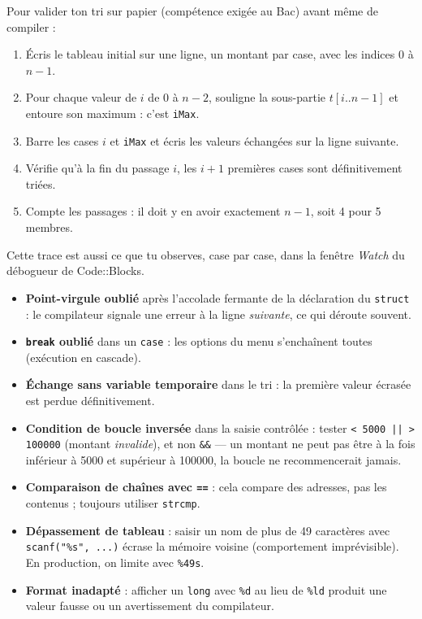 \documentclass[11pt]{article}
\begin{document}
\begin{methode}
Pour valider ton tri sur papier (compétence exigée au Bac) avant même de compiler :
\begin{enumerate}
  \item Écris le tableau initial sur une ligne, un montant par case, avec les indices $0$ à $n-1$.
  \item Pour chaque valeur de $i$ de $0$ à $n-2$, souligne la sous-partie $t[i..n-1]$ et entoure son maximum : c'est \texttt{iMax}.
  \item Barre les cases $i$ et \texttt{iMax} et écris les valeurs échangées sur la ligne suivante.
  \item Vérifie qu'à la fin du passage $i$, les $i+1$ premières cases sont définitivement triées.
  \item Compte les passages : il doit y en avoir exactement $n-1$, soit 4 pour 5 membres.
\end{enumerate}
Cette trace est aussi ce que tu observes, case par case, dans la fenêtre \emph{Watch} du débogueur de Code::Blocks.
\end{methode}

\begin{attention}
\begin{itemize}
  \item \textbf{Point-virgule oublié} après l'accolade fermante de la déclaration du \texttt{struct} : le compilateur signale une erreur à la ligne \emph{suivante}, ce qui déroute souvent.
  \item \textbf{\texttt{break} oublié} dans un \texttt{case} : les options du menu s'enchaînent toutes (exécution en cascade).
  \item \textbf{Échange sans variable temporaire} dans le tri : la première valeur écrasée est perdue définitivement.
  \item \textbf{Condition de boucle inversée} dans la saisie contrôlée : tester \texttt{< 5000 || > 100000} (montant \emph{invalide}), et non \texttt{\&\&} — un montant ne peut pas être à la fois inférieur à \num{5000} et supérieur à \num{100000}, la boucle ne recommencerait jamais.
  \item \textbf{Comparaison de chaînes avec \texttt{==}} : cela compare des adresses, pas les contenus ; toujours utiliser \texttt{strcmp}.
  \item \textbf{Dépassement de tableau} : saisir un nom de plus de 49 caractères avec \texttt{scanf("\%s", ...)} écrase la mémoire voisine (comportement imprévisible). En production, on limite avec \texttt{\%49s}.
  \item \textbf{Format inadapté} : afficher un \texttt{long} avec \texttt{\%d} au lieu de \texttt{\%ld} produit une valeur fausse ou un avertissement du compilateur.
\end{itemize}
\end{attention}
\end{document}
